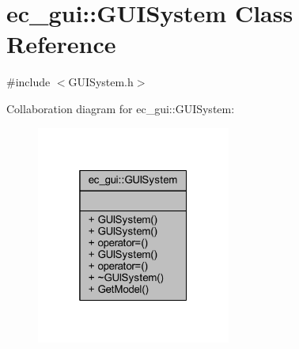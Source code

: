\hypertarget{classec__gui_1_1_g_u_i_system}{}\section{ec\+\_\+gui\+:\+:G\+U\+I\+System Class Reference}
\label{classec__gui_1_1_g_u_i_system}


{\ttfamily \#include $<$G\+U\+I\+System.\+h$>$}



Collaboration diagram for ec\+\_\+gui\+:\+:G\+U\+I\+System\+:\nopagebreak
\begin{figure}[H]
\begin{center}
\leavevmode
\includegraphics[width=181pt]{classec__gui_1_1_g_u_i_system__coll__graph}
\end{center}
\end{figure}
